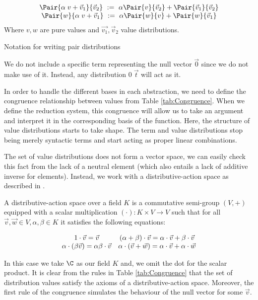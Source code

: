  \begin{table*}[tb]
  \[
    \begin{array}{c}
      \Pair{\alpha\; v+\vec{v}_1}{\vec{v}_2}~ := ~\alpha\Pair{v}{\vec{v}_2} + \Pair{\vec{v}_1}{\vec{v}_2}\\
      \Pair{w}{\alpha\; v+\vec{v}_1}~ := ~\alpha\Pair{w}{v} + \Pair{w}{\vec{v}_1}
    \end{array}
  \]
  Where $v,w$ are pure values and $\vec{v_1}, \vec{v}_2$ value distributions.
  \caption{Notation for writing pair distributions}
  \label{tab:PairsNotation}
 \end{table*}

\begin{remark}
  We do not include a specific term representing the null vector $\vec{0}$ since we do not make use of it. Instead, any distribution $0\;\vec{t}$ will act as it.
\end{remark}

In order to handle the different bases in each abstraction, we need to define the congruence relationship between values from Table \ref{tab:Congruence}. When we define the reduction system, this congruence will allow us to take an argument and interpret it in the corresponding basis of the function. Here, the structure of value distributions starts to take shape. The term and value distributions stop being merely syntactic terms and start acting as proper linear combinations.

The set of value distributions does not form a vector space, we can easily check this fact from the lack of a neutral element (which also entails a lack of additive inverse for elements). Instead, we work with a distributive-action space as described in \cite{DiazCaroMalherbe2022}.

A distributive-action space over a field $K$ is a commutative semi-group $(V,+)$ equipped with a scalar multiplication $(\cdot): K\times V\to V$ such that for all $\vec{v},\vec{w}\in V, \alpha,\beta\in K$ it satisfies the following equations:

\[
\begin{array}{c c}
1\cdot \vec{v} = \vec{v} & (\alpha + \beta)\cdot\vec{v} = \alpha\cdot\vec{v} + \beta\cdot\vec{v}\\
\alpha\cdot(\beta\vec{v}) = \alpha\beta\cdot \vec{v} & \alpha\cdot(\vec{v} + \vec{w}) = \alpha\cdot\vec{v} + \alpha\cdot\vec{w}
\end{array}
\]

In this case we take $\C$ as our field $K$ and, we omit the dot for the scalar product. It is clear from the rules in Table \ref{tab:Congruence} that the set of distribution values satisfy the axioms of a distributive-action space. Moreover, the first rule of the congruence simulates the behaviour of the null vector for some $\vec{v}$. 

